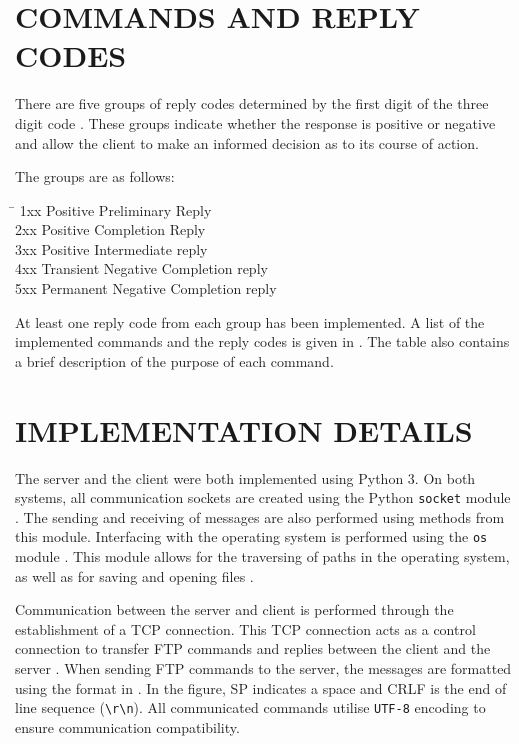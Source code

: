 \documentclass[10pt,twocolumn]{witseiepaper}
\newcommand*{\escape}[1]{\texttt{\textbackslash#1}}
\begin{document}
\section{COMMANDS AND REPLY CODES} \label{sec:commands}
There are five groups of reply codes determined by the first digit of the three digit code \cite{rfc}. These groups indicate whether the response is positive or negative and allow the client to make an informed decision as to its course of action.

The groups are as follows:
\begin{tabbing}
	\hspace{4em}\=\kill
1xx	\> Positive Preliminary Reply \\ 
2xx	\> Positive Completion Reply\\ 
3xx	\> Positive Intermediate reply \\ 
4xx	\> Transient Negative Completion reply \\ 
5xx	\> Permanent Negative Completion reply
\end{tabbing} 

At least one reply code from each group has been implemented. A list of the implemented commands and the reply codes is given in . The table also contains a brief description of the purpose of each command.

\section{IMPLEMENTATION DETAILS}
The server and the client were both implemented using Python 3. On both systems, all communication sockets are created using the Python \texttt{socket} module \cite{socket}. The sending and receiving of messages are also performed using methods from this module. Interfacing with the operating system is performed using the \texttt{os} module \cite{os}. This module allows for the traversing of paths in the operating system, as well as for saving and opening files \cite{os}. 

Communication between the server and client is performed through the establishment of a TCP connection. This TCP connection acts as a control connection to transfer FTP commands and replies between the client and the server \cite{kurose}. When sending FTP commands to the server, the messages are formatted using the format in . In the figure, SP indicates a space and CRLF is the end of line sequence (\escape{r}\escape{n}). All communicated commands utilise \texttt{UTF-8} encoding to ensure communication compatibility.
\end{document}
